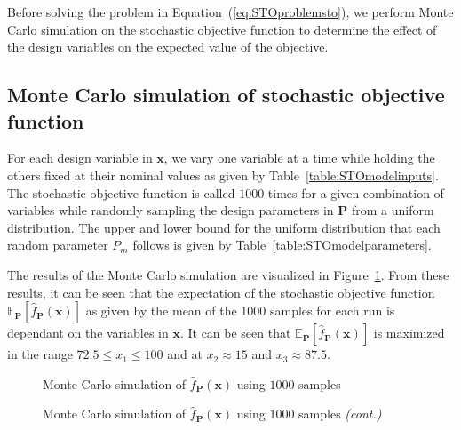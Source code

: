 Before solving the problem in Equation~(\ref{eq:STOproblemsto}), we perform Monte Carlo simulation on the stochastic objective function to determine the effect of the design variables on the expected value of the objective.

\subsection{Monte Carlo simulation of stochastic objective function} \label{subsec:MCSsto}


For each design variable in $\mathbf{x}$, we vary one variable at a time while holding the others fixed at their nominal values as given by Table~\ref{table:STOmodelinputs}. The stochastic objective function is called $1000$ times for a given combination of variables while randomly sampling the design parameters in $\mathbf{P}$ from a uniform distribution. The upper and lower bound for the uniform distribution that each random parameter $P_m$ follows is given by Table~\ref{table:STOmodelparameters}.

The results of the Monte Carlo simulation are visualized in Figure~\ref{fig:MSCStoblackbox}. From these results, it can be seen that the expectation of the stochastic objective function $\mathbb{E}_{\mathbf{P}}\left[\hat{f}_{\mathbf{P}}(\mathbf{x})\right]$ as given by the mean of the 1000 samples for each run is dependant on the variables in $\mathbf{x}$. It can be seen that $\mathbb{E}_{\mathbf{P}}\left[\hat{f}_{\mathbf{P}}(\mathbf{x})\right]$ is maximized in the range $ 72.5 \le x_1 \le 100 $ and at $x_2 \approx 15$ and $x_3 \approx 87.5$.

\begin{figure}[h!]
	\centering
	
	\caption[]{Monte Carlo simulation of $\hat{f}_{\mathbf{P}}(\mathbf{x})$ using $1000$ samples}
\end{figure}

\begin{figure}[h!]
	\ContinuedFloat %
	\caption[Monte Carlo simulation of $\hat{f}_{\mathbf{P}}(\mathbf{x})$ using $1000$ samples]{Monte Carlo simulation of $\hat{f}_{\mathbf{P}}(\mathbf{x})$ using $1000$ samples \emph{(cont.)}}
	\label{fig:MSCStoblackbox}
\end{figure}

